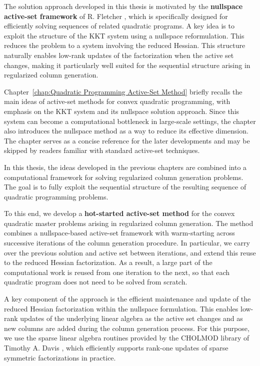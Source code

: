 \documentclass{book}
\theoremstyle{definition}
\numberwithin{algorithm_}{chapter}
\begin{document}
The solution approach developed in this thesis is motivated by the \textbf{nullspace active-set framework} of R. Fletcher \cite{fletcher2000stablehessian}, which is specifically designed for efficiently solving sequences of related quadratic programs.
A key idea is to exploit the structure of the KKT system using a nullspace reformulation. 
This reduces the problem to a system involving the reduced Hessian.
This structure naturally enables low-rank updates of the factorization when the active set changes, making it particularly well suited for the sequential structure arising in regularized column generation.

Chapter~\ref{chap:Quadratic Programming Active-Set Method} briefly recalls the main ideas of active-set methods for convex quadratic programming, with emphasis on the KKT system and its nullspace solution approach. 
Since this system can become a computational bottleneck in large-scale settings, the chapter also introduces the nullspace method as a way to reduce its effective dimension. 
The chapter serves as a concise reference for the later developments and may be skipped by readers familiar with standard active-set techniques.

\bigskip

In this thesis, the ideas developed in the previous chapters are combined into a computational framework for solving regularized column generation problems. 
The goal is to fully exploit the sequential structure of the resulting sequence of quadratic programming problems.

To this end, we develop a \textbf{hot-started active-set method} for the convex quadratic master problems arising in regularized column generation. 
The method combines a nullspace-based active-set framework with warm-starting across successive iterations of the column generation procedure. 
In particular, we carry over the previous solution and active set between iterations, and extend this reuse to the reduced Hessian factorization. 
As a result, a large part of the computational work is reused from one iteration to the next, so that each quadratic program does not need to be solved from scratch.

A key component of the approach is the efficient maintenance and update of the reduced Hessian factorization within the nullspace formulation. 
This enables low-rank updates of the underlying linear algebra as the active set changes and as new columns are added during the column generation process. 
For this purpose, we use the sparse linear algebra routines provided by the \textsc{CHOLMOD} library of Timothy A. Davis \cite{davis2006direct,davis1999modifying,chen2008cholmod}, which efficiently supports rank-one updates of sparse symmetric factorizations in practice.
\end{document}
